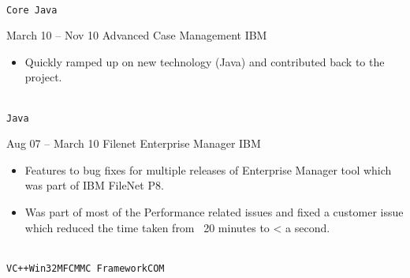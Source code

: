 \documentclass[9pt]{developercv} %
\begin{document}
\begin{entrylist}
{\begin{itemize}
        \end{itemize}
		\\ \texttt{Core Java}}
	\entry
		{March 10 -- Nov 10}
		{Advanced Case Management}
		{IBM}
		{\begin{itemize}
          \item Quickly ramped up on new technology (Java) and contributed back to the project.
        \end{itemize}
		\\ \texttt{Java}}
	\entry
		{Aug 07 -- March 10}
		{Filenet Enterprise Manager}
		{IBM}
		{\begin{itemize}
          \item Features to bug fixes for multiple releases of Enterprise Manager tool which was part of IBM FileNet P8.
          \item Was part of most of the Performance related issues and fixed a customer issue which reduced the time taken from ~20 minutes to < a second.
        \end{itemize}
		\\ \texttt{VC++}\slashsep\texttt{Win32}\slashsep\texttt{MFC}\slashsep\texttt{MMC Framework}\slashsep\texttt{COM}}
\end{entrylist}


\end{document}
